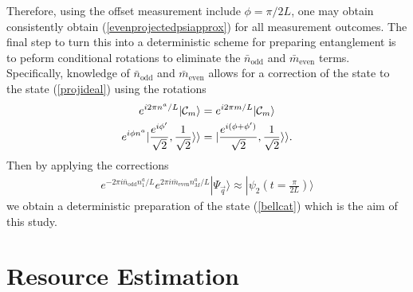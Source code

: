 \documentclass{WileyMSP-template}
\begin{document}
Therefore, using the offset measurement include $ \phi = \pi/2L$, one may obtain consistently obtain (\ref{evenprojectedpsiapprox}) for all measurement outcomes.  The final step to turn this into a deterministic scheme for preparing entanglement is to peform conditional rotations to eliminate the $ \bar{n}_\text{odd} $ and  $ \bar{m}_\text{even} $ terms.  Specifically, knowledge of $ \bar{n}_\text{odd} $ and  $ \bar{m}_\text{even} $  allows for a correction of the state to the state (\ref{projideal}) using the rotations
%
\begin{align}
e^{i 2 \pi n^a /L } | {\cal C}_m \rangle & = e^{i 2 \pi m /L } | {\cal C}_m \rangle \label{correction1} \\
e^{i \phi n^a } |\frac{e^{ i \phi' }}{\sqrt{2}},\frac{1}{\sqrt{2}}\rangle\rangle & = |\frac{e^{ i (\phi+\phi')  }}{\sqrt{2}},\frac{1}{\sqrt{2}}\rangle\rangle .
\label{correction2}
\end{align}
%
Then by applying the corrections
%
\begin{align}
e^{-2 \pi i \bar{n}_{\text{odd}}  n^a_1/L }  e^{2 \pi i \bar{m}_{\text{even}}  n^a_M/L }  | \Psi_{\vec{q}} \rangle \approx | \psi_2 (t= \frac{\pi}{2L} ) \rangle
\label{correction3}
\end{align}
%
we obtain a deterministic preparation of the state (\ref{bellcat}) which is the aim of this study.

















\section{Resource Estimation}
\end{document}
